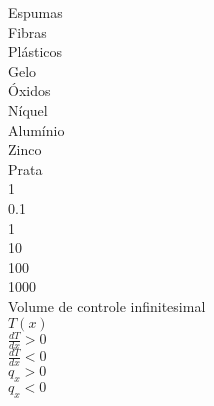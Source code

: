 Espumas \\

Fibras \\

Plásticos \\

Gelo \\

Óxidos \\ 

Níquel \\ 

Alumínio \\ 

Zinco \\ 

Prata \\ 

1 \\

0.1 \\

1 \\ 

10 \\ 

100 \\ 

1000 \\ 

Volume de controle infinitesimal \\ 

$T(x)$ \\

$\displaystyle \frac{dT}{dx} > 0 $ \\

$\displaystyle \frac{dT}{dx} < 0 $ \\


$q_x>0$ \\

$q_x<0$ \\

